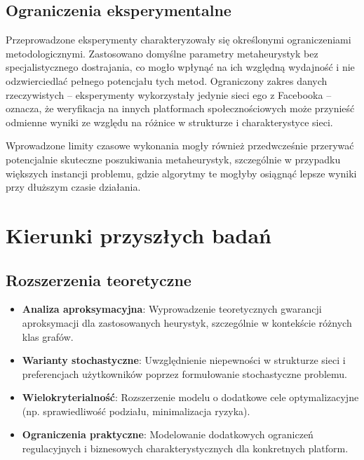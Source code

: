 \subsection{Ograniczenia eksperymentalne}

Przeprowadzone eksperymenty charakteryzowały się określonymi ograniczeniami metodologicznymi. Zastosowano domyślne parametry metaheurystyk bez specjalistycznego dostrajania, co mogło wpłynąć na ich względną wydajność i nie odzwierciedlać pełnego potencjału tych metod. Ograniczony zakres danych rzeczywistych -- eksperymenty wykorzystały jedynie sieci ego z Facebooka -- oznacza, że weryfikacja na innych platformach społecznościowych może przynieść odmienne wyniki ze względu na różnice w strukturze i charakterystyce sieci.

Wprowadzone limity czasowe wykonania mogły również przedwcześnie przerywać potencjalnie skuteczne poszukiwania metaheurystyk, szczególnie w przypadku większych instancji problemu, gdzie algorytmy te mogłyby osiągnąć lepsze wyniki przy dłuższym czasie działania.

\section{Kierunki przyszłych badań}

\subsection{Rozszerzenia teoretyczne}

\begin{itemize}
\item \textbf{Analiza aproksymacyjna}: Wyprowadzenie teoretycznych gwarancji aproksymacji dla zastosowanych heurystyk, szczególnie w kontekście różnych klas grafów.

\item \textbf{Warianty stochastyczne}: Uwzględnienie niepewności w strukturze sieci i preferencjach użytkowników poprzez formułowanie stochastyczne problemu.

\item \textbf{Wielokryterialność}: Rozszerzenie modelu o dodatkowe cele optymalizacyjne (np. sprawiedliwość podziału, minimalizacja ryzyka).

\item \textbf{Ograniczenia praktyczne}: Modelowanie dodatkowych ograniczeń regulacyjnych i biznesowych charakterystycznych dla konkretnych platform.
\end{itemize}

